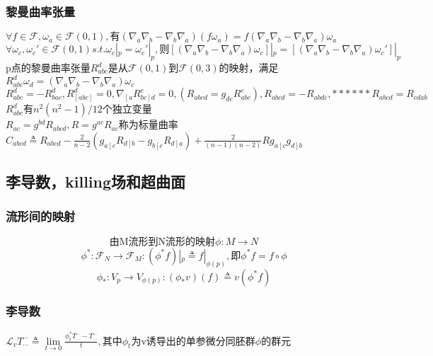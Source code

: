\documentclass{report}
\newcommand{\xkuo}[1]{\left(#1\right)}
\newcommand{\akuo}[1]{\left[#1\right]}
\newcommand{\utensors}[2][\cdots]{#2^{#1}_{#1}}
\newcommand{\duiyi}{\xkuo{\nabla_a\nabla_b-\nabla_b\nabla_a}}
\begin{document}
\subsubsection{黎曼曲率张量}
\(\forall f\in\mathscr{F}, \omega_a\in\mathscr{F}\xkuo{0,1}, \text{有}\xkuo{\nabla_a\nabla_b-\nabla_b\nabla_a}\xkuo{f\omega_a}=f\xkuo{\nabla_a\nabla_b-\nabla_b\nabla_a}\omega_a\)\\
\(\forall\omega_c,\omega_c'\in\mathscr{F}\xkuo{0,1} s.t.\omega_c|_p=\omega_c'|_p, \text{则}\akuo{\duiyi\omega_c}|_p=\akuo{\duiyi\omega_c'}|_p\)\\
p点的黎曼曲率张量\(R_{abc}^d\)是从\(\mathscr{F}\xkuo{0,1}\)到\(\mathscr{F}\xkuo{0,3}\)的映射，满足\(R_{abc}^d\omega_d=\duiyi\omega_c\)\\
\(R_{abc}^d=-R_{bac}^d, R_{\akuo{abc}}^d=0, \nabla_{\left[a\right.}R_{\left. bc\right]d}^e=0, \xkuo{R_{abcd}=g_{de}R_{abc}^e}, R_{abcd}=-R_{abdc},****** R_{abcd}=R_{cdab}\)\(R_{abc}^d\)有\(n^2\xkuo{n^2-1}/12\)个独立变量\\\(R_{ac}=g^{bd}R_{abcd}, R=g^{ac}R_{ac}\)称为标量曲率\\
\(C_{abcd}\triangleq R_{abcd}-\frac{2}{n-2}\xkuo{g_{a\left[ c\right.}R_{\left. d\right] b}-g_{b\left[ c\right.}R_{\left. d\right] a}}+\frac{2}{\xkuo{n-1}\xkuo{n-2}}Rg_{a\left[ c\right.}g_{\left. d\right] b}\)
\subsection{李导数，killing场和超曲面}
\subsubsection{流形间的映射}
\[\text{由M流形到N流形的映射}\phi:M\rightarrow N\]
\[\phi^*: \mathscr{F}_N\rightarrow\mathscr{F}_M: \xkuo{\phi^*f}|_p\triangleq f|_{\phi\xkuo{p}}, \text{即}\phi^*f=f\circ\phi\]
\[\phi_*:V_p\rightarrow V_{\phi\xkuo{p}}: \xkuo{\phi_*v}\xkuo{f}\triangleq v\xkuo{\phi^*f}\]
\subsubsection{李导数}
\(\mathscr{L}_v\utensors{T}\triangleq\lim\limits_{t\rightarrow 0}\frac{\phi_t^*\utensors{T}-\utensors{T}}{t}, \text{其中}\phi_t\)为v诱导出的单参微分同胚群\(\phi\)的群元\\
\end{document}
